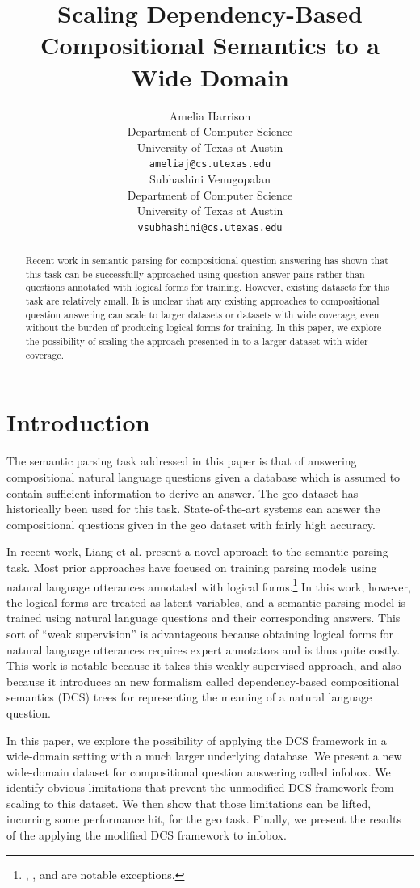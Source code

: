 \documentclass[11pt]{article}
\title{Scaling Dependency-Based Compositional Semantics to a Wide Domain}
\author{Amelia Harrison \\
  Department of Computer Science\\
  University of Texas at Austin \\
  {\tt ameliaj@cs.utexas.edu} \\\And
  Subhashini Venugopalan \\
  Department of Computer Science\\
  University of Texas at Austin \\
  {\tt vsubhashini@cs.utexas.edu} \\}
\date{}
\begin{document}
\maketitle
\begin{abstract}
   Recent work in semantic parsing for compositional question answering has shown
that this task can be successfully approached using question-answer pairs rather
than questions annotated with logical forms for training. However, existing
datasets for this task are relatively small. It is unclear  that any existing
approaches to compositional question answering can scale to larger datasets or
datasets with wide coverage, even without the burden of producing logical 
forms for training.  In this paper, we explore the possibility of scaling 
the approach presented in \cite{LJK11} to a larger dataset with wider coverage. 

\end{abstract}

\section{Introduction}

The semantic parsing task addressed in this paper is that of
answering compositional natural language questions given a database which is 
assumed to contain sufficient information to derive an answer. The {\sc geo}
dataset has historically been used for this task. State-of-the-art systems can
answer the compositional questions given in the {\sc geo} dataset with fairly
high accuracy. 

In recent work, Liang et al. present a novel approach to the semantic parsing
task. Most prior approaches have focused on training parsing models using natural
language utterances annotated with logical forms.\footnote{\cite{CGCR10}, 
\cite{CGRR11}, and \cite{PD09} are notable exceptions.} In this work, however,
the logical forms are treated as latent variables, and a semantic parsing model
is trained using natural language questions and their corresponding answers. 
This sort of ``weak supervision'' is advantageous because obtaining 
logical forms for natural language utterances requires expert annotators and is
thus quite costly. This work is notable because it takes this weakly supervised 
approach, and also because it introduces an new formalism called
dependency-based compositional semantics (DCS) trees for representing 
the meaning of a natural language question. 

In this paper, we explore the
possibility of applying the DCS framework in a wide-domain setting with a much
larger underlying database. We present a new wide-domain dataset for compositional 
question answering called {\sc infobox}. We identify obvious limitations that prevent 
the unmodified DCS framework from scaling to this dataset. We then show that
those limitations can be lifted, incurring some performance hit, for the {\sc
geo} task. Finally, we present the results of the applying the modified DCS
framework to {\sc infobox}. 
\end{document}
